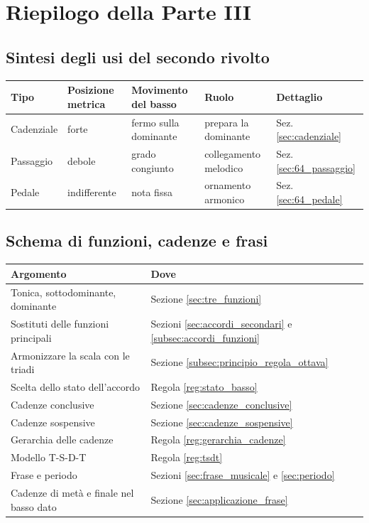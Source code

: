 \chapter{Riepilogo della Parte III}
\label{chap:riepilogo_iii}

\section{Sintesi degli usi del secondo rivolto}
\label{sec:sintesi_secondo_rivolto}

\begin{center}
\begin{tabularx}{\linewidth}{lLLLL}
\toprule
\textbf{Tipo} & \textbf{Posizione metrica} & \textbf{Movimento del basso} & \textbf{Ruolo} & \textbf{Dettaglio} \\
\midrule
Cadenziale & forte & fermo sulla dominante & prepara la dominante & Sez. \ref{sec:cadenziale} \\
Passaggio & debole & grado congiunto & collegamento melodico & Sez. \ref{sec:64_passaggio} \\
Pedale & indifferente & nota fissa & ornamento armonico & Sez. \ref{sec:64_pedale} \\
\bottomrule
\end{tabularx}
\end{center}

\section{Schema di funzioni, cadenze e frasi}
\label{sec:schema_iii}

\begin{center}
\small
\begin{tabular}{p{4.6cm}p{7.4cm}}
\toprule
\textbf{Argomento} & \textbf{Dove} \\
\midrule
Tonica, sottodominante, dominante & Sezione \ref{sec:tre_funzioni} \\
Sostituti delle funzioni principali & Sezioni \ref{sec:accordi_secondari} e \ref{subsec:accordi_funzioni} \\
Armonizzare la scala con le triadi & Sezione \ref{subsec:principio_regola_ottava} \\
Scelta dello stato dell'accordo & Regola \ref{reg:stato_basso} \\
Cadenze conclusive & Sezione \ref{sec:cadenze_conclusive} \\
Cadenze sospensive & Sezione \ref{sec:cadenze_sospensive} \\
Gerarchia delle cadenze & Regola \ref{reg:gerarchia_cadenze} \\
Modello T-S-D-T & Regola \ref{reg:tsdt} \\
Frase e periodo & Sezioni \ref{sec:frase_musicale} e \ref{sec:periodo} \\
Cadenze di metà e finale nel basso dato & Sezione \ref{sec:applicazione_frase} \\
\bottomrule
\end{tabular}
\end{center}
